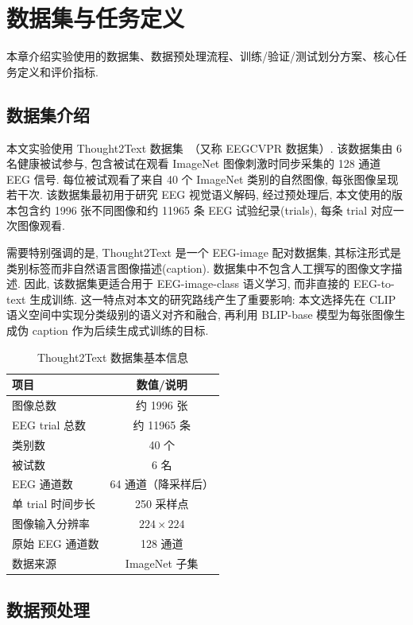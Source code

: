 \section{数据集与任务定义}

本章介绍实验使用的数据集、数据预处理流程、训练/验证/测试划分方案、核心任务定义和评价指标.

\subsection{数据集介绍}

本文实验使用 Thought2Text 数据集~\cite{tirupattur2018thoughtviz}（又称 EEGCVPR 数据集）. 该数据集由 6 名健康被试参与, 包含被试在观看 ImageNet 图像刺激时同步采集的 128 通道 EEG 信号. 每位被试观看了来自 40 个 ImageNet 类别的自然图像, 每张图像呈现若干次. 该数据集最初用于研究 EEG 视觉语义解码, 经过预处理后, 本文使用的版本包含约 1996 张不同图像和约 11965 条 EEG 试验纪录(trials), 每条 trial 对应一次图像观看.

需要特别强调的是, Thought2Text 是一个 EEG-image 配对数据集, 其标注形式是类别标签而非自然语言图像描述(caption). 数据集中不包含人工撰写的图像文字描述. 因此, 该数据集更适合用于 EEG-image-class 语义学习, 而非直接的 EEG-to-text 生成训练. 这一特点对本文的研究路线产生了重要影响: 本文选择先在 CLIP 语义空间中实现分类级别的语义对齐和融合, 再利用 BLIP-base 模型为每张图像生成伪 caption 作为后续生成式训练的目标.

\begin{table}[H]
  \centering
  \caption{Thought2Text 数据集基本信息}
  \label{tab:dataset}
  \begin{tabular}{l c}
    \toprule
    项目 & 数值/说明 \\
    \midrule
    图像总数 & 约 1996 张 \\
    EEG trial 总数 & 约 11965 条 \\
    类别数 & 40 个 \\
    被试数 & 6 名 \\
    EEG 通道数 & 64 通道（降采样后）\\
    单 trial 时间步长 & 250 采样点 \\
    图像输入分辨率 & $224\times224$ \\
    原始 EEG 通道数 & 128 通道 \\
    数据来源 & ImageNet 子集 \\
    \bottomrule
  \end{tabular}
\end{table}

\subsection{数据预处理}

